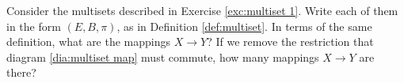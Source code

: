 \begin{exercise}
Consider the multisets described in Exercise \ref{exc:multiset 1}. 
\sexc Write each of them in the form $(E,B,\pi)$, as in Definition \ref{def:multiset}. 
\next In terms of the same definition, what are the mappings $X\to Y$? 
\next If we remove the restriction that diagram \ref{dia:multiset map} must commute, how many mappings $X\to Y$ are there?
\endsexc
\end{exercise}

%
%
%
%
%

